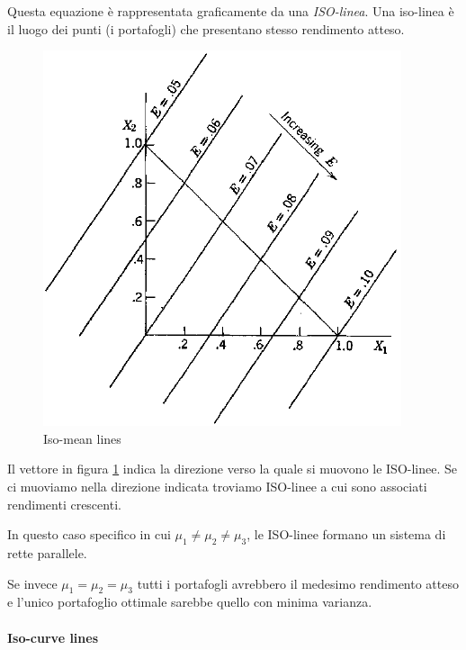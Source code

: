 Questa equazione è rappresentata graficamente da una \textit{ISO-linea}. Una iso-linea è il luogo dei punti (i portafogli) che presentano stesso rendimento atteso. 

\begin{figure}[h!]
	\centering
	\includegraphics[width=0.4\linewidth]{"imgs/isomean line"}
	\caption{Iso-mean lines}
	\label{fig:isomean-line}
\end{figure}

Il vettore in figura \ref{fig:isomean-line} indica la direzione verso la quale si muovono le ISO-linee. Se ci muoviamo nella direzione indicata troviamo ISO-linee a cui sono associati rendimenti crescenti. 

In questo caso specifico in cui $\mu_{1}\neq\mu_{2}\neq\mu_{3}$, le ISO-linee formano un sistema di rette parallele. 

Se invece $\mu_{1}=\mu_{2}=\mu_{3}$ tutti i portafogli avrebbero il medesimo rendimento atteso e l'unico portafoglio ottimale sarebbe quello con minima varianza. 

\paragraph{Iso-curve lines}

